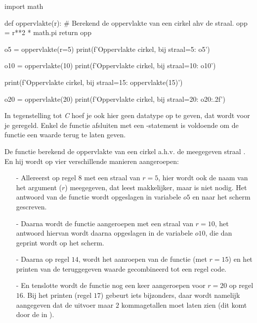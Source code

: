 \begin{python}
import math 

def oppervlakte(r):
    # Berekend de oppervlakte van een cirkel ahv de straal.
    opp = r**2 * math.pi
    return opp

o5 = oppervlakte(r=5)
print(f'Oppervlakte cirkel, bij straal=5:  {o5}')

o10 = oppervlakte(10)
print(f'Oppervlakte cirkel, bij straal=10: {o10}')

print(f'Oppervlakte cirkel, bij straal=15: {oppervlakte(15)}')

o20 = oppervlakte(20)
print(f'Oppervlakte cirkel, bij straal=20: {o20:.2f}')
\end{python}

In tegenstelling tot \textit{C} hoef je ook hier geen datatype op te geven, dat wordt voor je geregeld. Enkel de functie afsluiten met een -statement is voldoende om de functie een waarde terug te laten geven. \newline


De functie  berekend de oppervlakte van een cirkel a.h.v. de meegegeven straal . En hij wordt op vier verschillende manieren aangeroepen:
\begin{enumerate}
	\item[-] Allereerst op regel $8$ met een straal van $r=5$, hier wordt ook de naam van het argument ($r$) meegegeven, dat leest makkelijker, maar is niet nodig. Het antwoord van de functie wordt opgeslagen in variabele $o5$ en naar het scherm gescreven. \newline

	\item[-] Daarna wordt de functie aangeroepen met een straal van $r=10$, het antwoord hiervan wordt daarna opgeslagen in de variabele $o10$, die dan geprint wordt op het scherm. \newline

	\item[-] Daarna op regel $14$, wordt het aanroepen van de functie (met $r=15$) en het printen van de teruggegeven waarde gecombineerd tot een regel code. \newline

	\item[-] En tenslotte wordt de functie nog een keer aangeroepen voor $r=20$ op regel $16$. Bij het printen (regel $17$) gebeurt iets bijzonders, daar wordt namelijk aangegeven dat de uitvoer maar $2$ kommagetallen moet laten zien (dit komt door de  in ). 
\end{enumerate}

